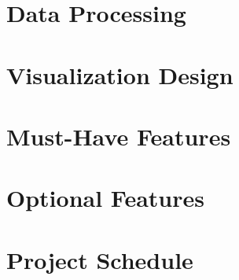 \documentclass{article}
\begin{document}
\section{Data Processing}

\section{Visualization Design}
\section{Must-Have Features}
\section{Optional Features}
\section{Project Schedule}
\end{document}
